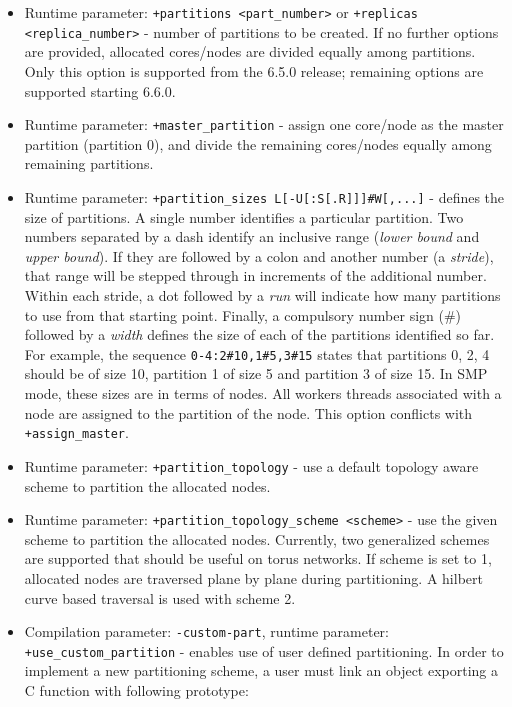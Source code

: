 \begin{itemize}
\item Runtime parameter: {\tt +partitions <part\_number>} or {\tt +replicas
<replica\_number>} - number of partitions to be created. If no further options are
provided, allocated cores/nodes are divided equally among partitions. Only this option 
is supported from the 6.5.0 release; remaining options are supported starting 6.6.0.

\item Runtime parameter: {\tt +master\_partition} - assign one core/node as the master 
partition (partition 0), and divide the remaining cores/nodes equally among remaining
partitions.

\item Runtime parameter: {\tt +partition\_sizes L[-U[:S[.R]]]\#W[,...]} - defines the size of 
partitions.  A single number identifies a particular partition. Two numbers separated by
a dash identify an inclusive range (\emph{lower bound} and \emph{upper bound}). If they 
are followed by a colon and another number (a \emph{stride}), that range will be stepped 
through in increments of the additional number. Within each stride, a dot followed by a
\emph{run} will indicate how many partitions to use from that starting point.  Finally, 
a compulsory number sign (\#) followed by a \emph{width} defines the size of each of the
partitions identified so far. For example, the sequence {\tt 0-4:2\#10,1\#5,3\#15} states that 
partitions 0, 2, 4 should be of size 10, partition 1 of size 5 and partition 3 of size 15. 
In SMP mode, these sizes are in terms of nodes. All workers threads associated with a node are
assigned to the partition of the node. This option conflicts with {\tt +assign\_master}.

\item Runtime parameter: {\tt +partition\_topology} - use a default topology aware scheme
to partition the allocated nodes. 

\item Runtime parameter: {\tt +partition\_topology\_scheme <scheme>} - use the given scheme
to partition the allocated nodes. Currently, two generalized schemes are supported that 
should be useful on torus networks. If scheme is set to 1, allocated nodes are traversed 
plane by plane during partitioning. A hilbert curve based traversal is used with scheme 2.

\item Compilation parameter: {\tt -custom-part}, runtime parameter: {\tt +use\_custom\_partition} -
enables use of user defined partitioning. In order to implement a new partitioning scheme, 
a user must link an object exporting a C function with following prototype: \\ 


\end{itemize}
